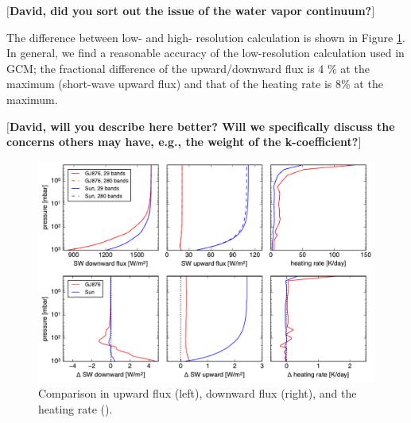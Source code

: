 \documentclass[11pt,numberedappendix,twocolappendix,]{emulateapj}
\def\memo#1{\color{red}$[${\bf #1}$]$ \color{black}}
\begin{document}
\memo{David, did you sort out the issue of the water vapor continuum?}

The difference between low- and high- resolution calculation is shown in Figure \ref{fig:socrates}. 
In general, we find a reasonable accuracy of the low-resolution calculation used in GCM; the fractional difference of the upward/downward flux is 4 \% at the maximum (short-wave upward flux) and that of the heating rate is 8\% at the maximum. 

\memo{David, will you describe here better? Will we specifically discuss the concerns others may have, e.g., the weight of the k-coefficient?}

\begin{figure}[!htb]
    \begin{center}
    \includegraphics[width=0.8\hsize]{fig/rad_comparison_SW29-SW280_AqOH0TLS_GJ876S12P20L40Q.pdf}
    \end{center}
\caption{Comparison in upward flux (left), downward flux (right), and the heating rate (). }                                                                                                             
\label{fig:socrates}
\end{figure}

\end{document}
